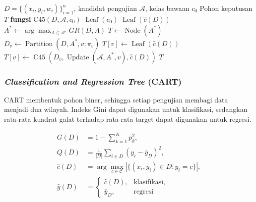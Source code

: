 \begin{algorithm}[H]
    \caption{Pembentukan pohon klasifikasi C4.5}
    \label{alg:c45}
    \begin{algorithmic}[1]
        \REQUIRE $D=\{(x_i,y_i,w_i)\}_{i=1}^{n}$, kandidat pengujian $\mathcal{A}$, kelas bawaan $c_0$
        \ENSURE Pohon keputusan $T$
        \STATE \textbf{fungsi} C45$(D,\mathcal{A},c_0)$
        \RETURN $\operatorname{Leaf}(c_0)$
        \ENDIF
        \RETURN $\operatorname{Leaf}(\hat{c}(D))$
        \ENDIF
        \STATE $A^*\leftarrow\arg\max_{A\in\mathcal{A}'}GR(D,A)$
        \STATE $T\leftarrow\operatorname{Node}(A^*)$
        \STATE $D_v\leftarrow\operatorname{Partition}(D,A^*,v;\pi_v)$
        \STATE $T[v]\leftarrow\operatorname{Leaf}(\hat{c}(D))$
        \ELSE
        \STATE $T[v]\leftarrow\operatorname{C45}(D_v,\operatorname{Update}(\mathcal{A},A^*,v),\hat{c}(D))$
        \ENDIF
        \ENDFOR
        \RETURN $T$
    \end{algorithmic}
\end{algorithm}

\subsubsection{\textit{Classification and Regression Tree} (CART)}

CART membentuk pohon biner, sehingga setiap pengujian membagi data menjadi dua wilayah. Indeks Gini dapat digunakan untuk klasifikasi, sedangkan rata-rata kuadrat galat terhadap rata-rata target dapat digunakan untuk regresi.

\begin{equation}
    \begin{aligned}
        G(D)       & =1-\sum_{k=1}^{K}p_k^2,                                \\
        Q(D)       & =\frac{1}{|D|}\sum_{i\in D}(y_i-\bar{y}_D)^2,          \\
        \hat{c}(D) & =\arg\max_{c\in\mathcal{C}}|\{(x_i,y_i)\in D:y_i=c\}|, \\
        \hat{y}(D) & =\begin{cases}
                          \hat{c}(D), & \text{klasifikasi}, \\
                          \bar{y}_D,  & \text{regresi}
                      \end{cases}
    \end{aligned}
    \label{eq:cart-impurity}
\end{equation}

